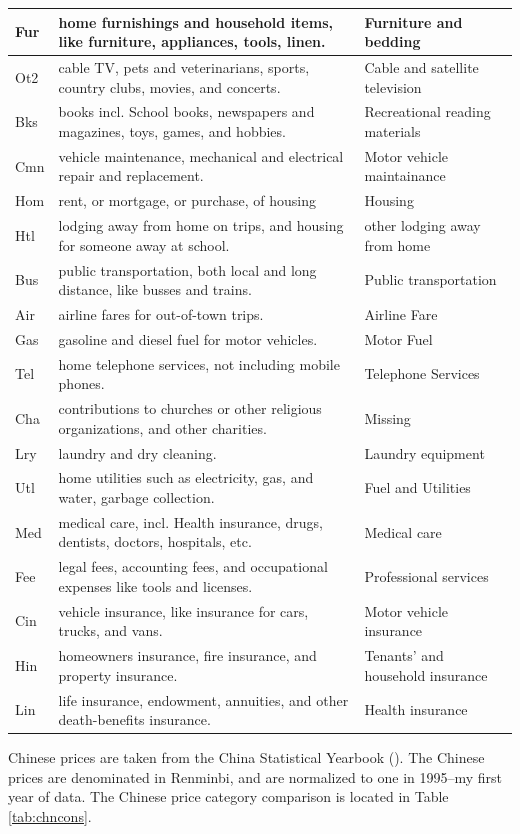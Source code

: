 \documentclass[12pt]{article}
\begin{document}
\begin{table}
\begin{sideways}
\begin{tabular}{|l|l|l|}
\hline
Fur & home furnishings and household items, like furniture, appliances, tools, linen. & Furniture and bedding\\ 
\hline
Ot2 & cable TV, pets and veterinarians, sports, country clubs, movies, and concerts. & Cable and satellite television\\ 
\hline
Bks & books incl. School books, newspapers and magazines, toys, games, and hobbies. & Recreational reading materials\\ 
\hline
Cmn & vehicle maintenance, mechanical and electrical repair and replacement. & Motor vehicle maintainance\\ 
\hline
Hom & rent, or mortgage, or purchase, of housing & Housing\\ 
\hline
Htl & lodging away from home on trips, and housing for someone away at school. & other lodging away from home\\ 
\hline
Bus & public transportation, both local and long distance, like busses and trains. & Public transportation\\ 
\hline
Air & airline fares for out-of-town trips. & Airline Fare\\ 
\hline
Gas & gasoline and diesel fuel for motor vehicles. & Motor Fuel\\ 
\hline
Tel & home telephone services, not including mobile phones. & Telephone Services\\ 
\hline
Cha & contributions to churches or other religious organizations, and other charities. & Missing\\ 
\hline
Lry & laundry and dry cleaning. & Laundry equipment\\ 
\hline
Utl & home utilities such as electricity, gas, and water, garbage collection. & Fuel and Utilities\\ 
\hline
Med & medical care, incl. Health insurance, drugs, dentists, doctors, hospitals, etc. & Medical care\\ 
\hline
Fee & legal fees, accounting fees, and occupational expenses like tools and licenses. & Professional services\\ 
\hline
Cin & vehicle insurance, like insurance for cars, trucks, and vans. & Motor vehicle insurance\\ 
\hline
Hin & homeowners insurance, fire insurance, and property insurance. & Tenants' and household insurance\\ 
\hline
Lin & life insurance, endowment, annuities, and other death-benefits insurance. & Health insurance\\ 
\hline
\end{tabular}
\end{sideways}
\end{table}
Chinese prices are taken from the China Statistical Yearbook (\citep{CSY}).  The Chinese prices are denominated in Renminbi, and are normalized to one in 1995--my first year of data. The Chinese price category comparison is located in Table \ref{tab:chncons}. 
\end{document}
